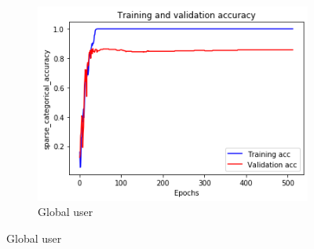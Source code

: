 \documentclass[12pt]{article}
\begin{document}
\begin{figure}[H]
\centering
\begin{subfigure}{0.45\textwidth}
    \centering
    \includegraphics[width=\textwidth]{resources/posture_global_0.7-accuracy.png}
    \caption{\small Global user}


\end{subfigure}
\end{figure}
\end{document}
